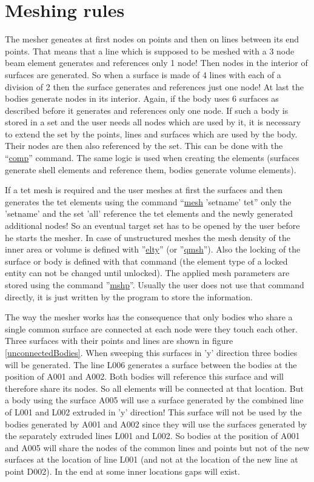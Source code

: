 \documentclass{article}
\providecommand{\htmlref}[2]{\hyperref[#2]{#1}}
\begin{document}
\section{\label{Meshing rules}Meshing rules}
The mesher geneates at first nodes on points and then on lines between its end points. That means that a line which is supposed to be meshed with a 3 node beam element generates and references only 1 node! Then nodes in the interior of surfaces are generated. So when a surface is made of 4 lines with each of a division of 2 then the surface generates and references just one node! At last the bodies generate nodes in its interior. Again, if the body uses 6 surfaces as described before it generates and references only one node. If such a body is stored in a set and the user needs all nodes which are used by it, it is necessary to extend the set by the points, lines and surfaces which are used by the body. Their nodes are then also referenced by the set. This can be done with the ``\htmlref{comp}{comp}'' command. The same logic is used when creating the elements (surfaces generate shell elements and reference them, bodies generate volume elements).

If a tet mesh is required and the user meshes at first the surfaces and then generates the tet elements using the command ``\htmlref{mesh}{mesh} 'setname' tet'' only the 'setname' and the set 'all' reference the tet elements and the newly generated additional nodes! So an eventual target set has to be opened by the user before he starts the mesher. In case of unstructured meshes the mesh density of the inner area or volume is defined with ''\htmlref{elty}{elty}'' (or ''\htmlref{qmsh}{qmsh}''). Also the locking of the surface or body is defined with that command (the element type of a locked entity can not be changed until unlocked). The applied mesh parameters are stored using the command ''\htmlref{mshp}{mshp}''. Usually the user does not use that command directly, it is just written by the program to store the information.

The way the mesher works has the consequence that only bodies who share a single common surface are connected at each node were they touch each other. Three surfaces with their points and lines are shown in figure \ref{unconnectedBodies}. When sweeping this surfaces in 'y' direction three bodies will be generated. The line L006 generates a surface between the bodies at the position of A001 and A002. Both bodies will reference this surface and will therefore share its nodes. So all elements will be connected at that location. But a body using the surface A005 will use a surface generated by the combined line of L001 and L002 extruded in 'y' direction! This surface will not be used by the bodies generated by A001 and A002 since they will use the surfaces generated by the separately extruded lines L001 and L002. So bodies at the position of A001 and A005 will share the nodes of the common lines and points but not of the new surfaces at the location of line L001 (and not at the location of the new line at point D002). In the end at some inner locations gaps will exist.
  
\end{document}
